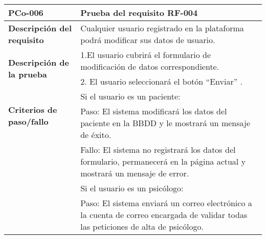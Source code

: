 \begin{table}[htpb]
\centering
\begin{tabularx}{\textwidth}{|l|X|}
\hline
\rowcolor[gray]{0.9}\textbf{PCo-006}                                     & \textbf{Prueba del requisito RF-004}                                                                                                                                                                                                                                                                                                     \\ \hline
\textbf{Descripción del requisito}                 & Cualquier usuario registrado en la plataforma podrá modificar sus datos de usuario.                                                                                                                                                                                                                                                      \\ \hline
\multirow{2}{*}{\textbf{Descripción de la prueba}} & 1.El usuario cubrirá el formulario de modificación de datos correspondiente.                                                                                                                                                                                                                                                             \\ \cline{2-2} 
                                                   & 2. El usuario seleccionará el botón ``Enviar'' .                                                                                                                                                                                                                                                                                            \\ \hline
\multirow{2}{*}{\textbf{Criterios de paso/fallo}}  & Si el usuario es un paciente: \\
& Paso: El sistema modificará los datos del paciente en la BBDD y le mostrará un mensaje de éxito.\\
& Fallo: El sistema no registrará los datos del formulario, permanecerá en la página actual y mostrará un mensaje de error.\\ \cline{2-2} 
                                                   & Si el usuario es un psicólogo: \\
                                                   & Paso: El sistema enviará un correo electrónico a la cuenta de correo encargada de validar todas las peticiones de alta de psicólogo.\\ 

\end{tabularx}
\end{table}
